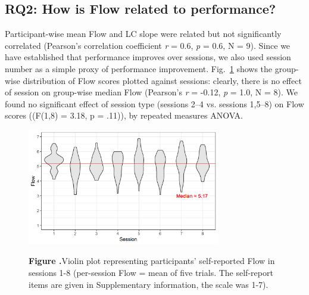 \documentclass{frontierstyle/frontiersSCNS}
\newcommand{\hl}{\textcolor{red!80}}
\newcommand{\nicewidth}{0.75\textwidth}
\begin{document}
\subsection{RQ2: How is Flow related to performance?}

Participant-wise mean Flow and LC slope were related but not significantly correlated (Pearson's correlation coefficient {\it r} = 0.6, {\it p} = 0.6, N = 9). %
Since we have established that performance improves over sessions, we also used session number as a simple proxy of performance improvement. Fig.~\ref{fig:FlowVssn} shows the group-wise distribution of Flow scores plotted against sessions: clearly, there is no effect of session on group-wise median Flow (Pearson's {\it r} = -0.12, {\it p} = 1.0, N = 8). \hl{We found no significant effect of session type (sessions 2--4 vs. sessions 1,5--8) on Flow scores ((F(1,8) = 3.18, p = .11)), by repeated measures ANOVA.} %

\begin{figure}[!b]
\begin{center}
	\includegraphics[width=\nicewidth]{4_session_fss2}
\end{center}
	\textbf{\label{fig:FlowVssn} Figure .}{Violin plot representing participants' self-reported Flow in sessions 1-8 (per-session Flow = mean of five trials. The self-report items are given in Supplementary information, the scale was 1-7).}
\end{figure}
\end{document}
